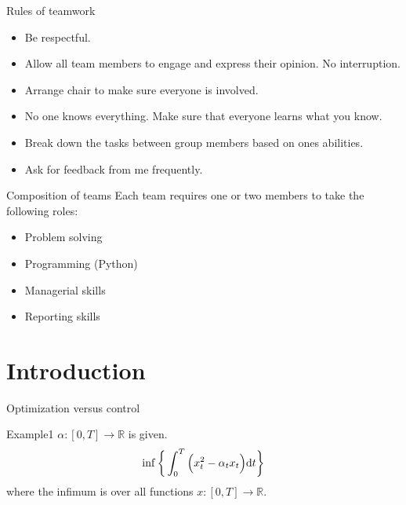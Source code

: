 \documentclass[color=usenames,dvipsnames]{beamer}
\newcommand{\dt}{\text{\normalfont d}t}
\begin{document}
\begin{frame}{Rules of teamwork}
    \begin{itemize}[label = $\bullet$]
        \item Be respectful.
        \item Allow all team members to engage and express their opinion. No interruption.
        \item Arrange chair to make sure everyone is involved.
        \item No one knows everything. Make sure that everyone learns what you know.
        \item Break down the tasks between group members based on ones abilities.
        \item Ask for feedback from me frequently.
    \end{itemize}
\end{frame}

\begin{frame}{Composition of teams}
Each team requires one or two members to take the following roles:
    \begin{itemize}[label = $\bullet$]
         \item Problem solving 
         \item Programming (Python)
         \item Managerial skills
         \item Reporting skills
     \end{itemize}
\end{frame}

\section{Introduction}

\begin{frame}{Optimization versus control}

\begin{block}{Example1}
$\alpha:[0,T]\to\mathbb{R}$ is given.
    \begin{equation*}
        \inf\bigg\{\int_0^T\Big(x_t^2 - \alpha_t x_t\Big) {{\dt}}\bigg\}
    \end{equation*}
where the infimum is over all functions $x:[0,T]\to\mathbb{R}$. 
\end{block}
\end{frame}
\end{document}
